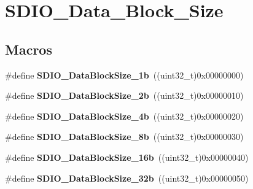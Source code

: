 \hypertarget{group___s_d_i_o___data___block___size}{}\section{S\+D\+I\+O\+\_\+\+Data\+\_\+\+Block\+\_\+\+Size}
\label{group___s_d_i_o___data___block___size}
\subsection*{Macros}
\begin{DoxyCompactItemize}
\item 
\hypertarget{group___s_d_i_o___data___block___size_gaa86e90ddc3426b242a5230b3360c620d}{}\#define {\bfseries S\+D\+I\+O\+\_\+\+Data\+Block\+Size\+\_\+1b}~((uint32\+\_\+t)0x00000000)\label{group___s_d_i_o___data___block___size_gaa86e90ddc3426b242a5230b3360c620d}

\item 
\hypertarget{group___s_d_i_o___data___block___size_ga7209d9d52635b66df85712c6fcd668ea}{}\#define {\bfseries S\+D\+I\+O\+\_\+\+Data\+Block\+Size\+\_\+2b}~((uint32\+\_\+t)0x00000010)\label{group___s_d_i_o___data___block___size_ga7209d9d52635b66df85712c6fcd668ea}

\item 
\hypertarget{group___s_d_i_o___data___block___size_ga59cbaecfdebd63177d1208c268626f0a}{}\#define {\bfseries S\+D\+I\+O\+\_\+\+Data\+Block\+Size\+\_\+4b}~((uint32\+\_\+t)0x00000020)\label{group___s_d_i_o___data___block___size_ga59cbaecfdebd63177d1208c268626f0a}

\item 
\hypertarget{group___s_d_i_o___data___block___size_ga14f91159c8c4faf49a335ed9b6a94d0b}{}\#define {\bfseries S\+D\+I\+O\+\_\+\+Data\+Block\+Size\+\_\+8b}~((uint32\+\_\+t)0x00000030)\label{group___s_d_i_o___data___block___size_ga14f91159c8c4faf49a335ed9b6a94d0b}

\item 
\hypertarget{group___s_d_i_o___data___block___size_ga52a7bdab9a75edd94d9c1152e8b078e2}{}\#define {\bfseries S\+D\+I\+O\+\_\+\+Data\+Block\+Size\+\_\+16b}~((uint32\+\_\+t)0x00000040)\label{group___s_d_i_o___data___block___size_ga52a7bdab9a75edd94d9c1152e8b078e2}

\item 
\hypertarget{group___s_d_i_o___data___block___size_gad0f89aa989c0cedf8d69eb28548413ca}{}\#define {\bfseries S\+D\+I\+O\+\_\+\+Data\+Block\+Size\+\_\+32b}~((uint32\+\_\+t)0x00000050)\label{group___s_d_i_o___data___block___size_gad0f89aa989c0cedf8d69eb28548413ca}


\end{DoxyCompactItemize}
